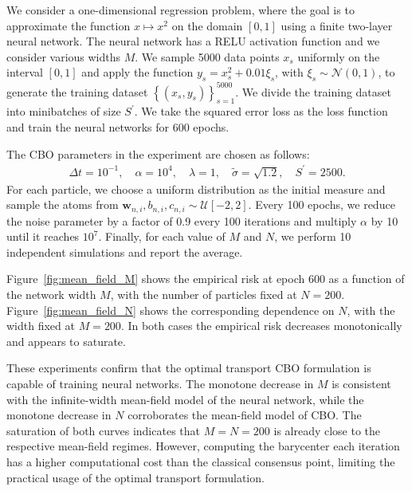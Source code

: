 \documentclass[a4paper, 11pt]{article}
\theoremstyle{plain} %
\begin{document}
	We consider a one-dimensional regression problem, where the goal is to approximate the function $ x \mapsto x^2 $ on the domain $ [0,1]$ using a finite two-layer neural network. The neural network has a RELU activation function and we consider various widths $ M $. We sample 5000 data points $ x_s $ uniformly on the interval $ [0,1] $ and apply the function $ y_s = x^2_s + 0.01 \xi_s $, with $ \xi_s \sim \mathcal{N}(0,1)$, to generate the training dataset $\left\{\left( x_{s}, y_{s} \right)\right\}_{s=1}^{5000}$. We divide the training dataset into minibatches of size $ S^\prime$.  We take the squared error loss as the loss function and train the neural networks for 600 epochs. 
	
	The CBO parameters in the experiment are chosen as follows:
	\begin{align*}
		\Delta t = 10^{-1}, \quad \alpha = 10^4, \quad \lambda = 1, \quad \tilde{\sigma} = \sqrt{1.2}, \quad S^\prime = 2500. 
	\end{align*}
	For each particle, we choose a uniform distribution as the initial measure and sample the atoms from $ \bm{w}_{n,i}, b_{n,i}, c_{n,i} \sim \mathcal{U}[-2,2] $. Every 100 epochs, we reduce the noise parameter by a factor of 0.9 every 100 iterations and multiply $ \alpha $ by 10 until it reaches $ 10^7 $. Finally, for each value of $ M $ and $N$, we perform 10 independent simulations and report the average. 

	Figure~\ref{fig:mean_field_M} shows the empirical risk at epoch 600 as a function
	of the network width $M$, with the number of particles fixed at $N = 200$.
	Figure~\ref{fig:mean_field_N} shows the corresponding dependence on $N$, with the
	width fixed at $M = 200$. In both cases the empirical risk decreases monotonically and appears to saturate.

	These experiments confirm that the optimal transport CBO formulation is capable of
	training neural networks. The monotone decrease in $M$ is consistent with the
	infinite-width mean-field model of the neural network, while the monotone decrease
	in $N$ corroborates the mean-field model of CBO. The saturation of both curves indicates that $M = N = 200$ is already close to the respective mean-field regimes. However, computing the barycenter each iteration has a higher computational cost than the classical consensus point, limiting the practical usage of the optimal transport formulation. 
\end{document}

